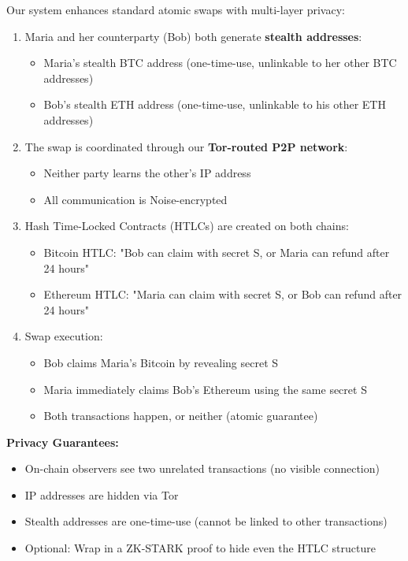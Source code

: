\documentclass[11pt,a4paper]{article}
\begin{document}
Our system enhances standard atomic swaps with multi-layer privacy:
\begin{enumerate}
    \item Maria and her counterparty (Bob) both generate \textbf{stealth addresses}:
    \begin{itemize}
        \item Maria's stealth BTC address (one-time-use, unlinkable to her other BTC addresses)
        \item Bob's stealth ETH address (one-time-use, unlinkable to his other ETH addresses)
    \end{itemize}

    \item The swap is coordinated through our \textbf{Tor-routed P2P network}:
    \begin{itemize}
        \item Neither party learns the other's IP address
        \item All communication is Noise-encrypted
    \end{itemize}

    \item Hash Time-Locked Contracts (HTLCs) are created on both chains:
    \begin{itemize}
        \item Bitcoin HTLC: "Bob can claim with secret S, or Maria can refund after 24 hours"
        \item Ethereum HTLC: "Maria can claim with secret S, or Bob can refund after 24 hours"
    \end{itemize}

    \item Swap execution:
    \begin{itemize}
        \item Bob claims Maria's Bitcoin by revealing secret S
        \item Maria immediately claims Bob's Ethereum using the same secret S
        \item Both transactions happen, or neither (atomic guarantee)
    \end{itemize}
\end{enumerate}

\textbf{Privacy Guarantees:}
\begin{itemize}
    \item On-chain observers see two unrelated transactions (no visible connection)
    \item IP addresses are hidden via Tor
    \item Stealth addresses are one-time-use (cannot be linked to other transactions)
    \item Optional: Wrap in a ZK-STARK proof to hide even the HTLC structure
\end{itemize}
\end{document}
